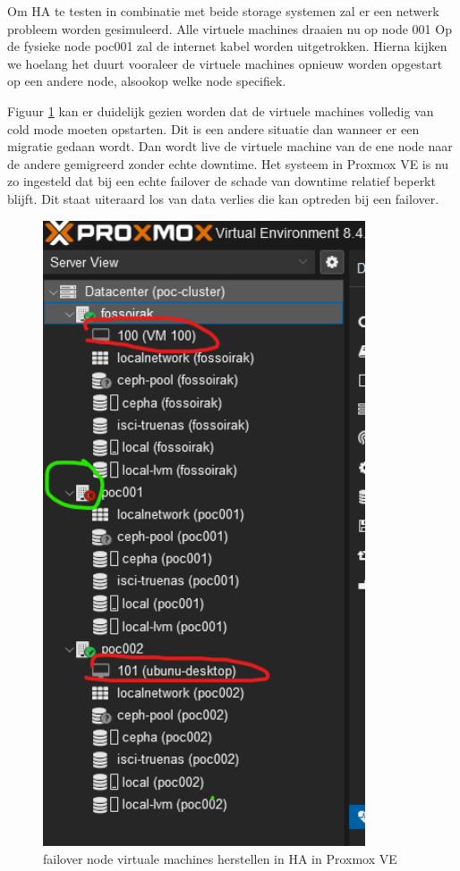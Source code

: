 Om HA te testen in combinatie met beide storage systemen zal er een netwerk probleem worden gesimuleerd.
Alle virtuele machines draaien nu op node 001
Op de fysieke node poc001 zal de internet kabel worden uitgetrokken. Hierna kijken we hoelang het duurt vooraleer de virtuele machines opnieuw worden opgestart op een andere node, alsookop welke node specifiek.

Figuur \ref{fig:failover-vm} kan er duidelijk gezien worden dat de virtuele machines volledig van cold mode moeten opstarten. Dit is een andere situatie dan wanneer er een migratie gedaan wordt.
Dan wordt live de virtuele machine van de ene node naar de andere gemigreerd zonder echte downtime.
Het systeem in Proxmox VE is nu zo ingesteld dat bij een echte failover de schade van downtime relatief beperkt blijft. Dit staat uiteraard los van data verlies die kan optreden bij een failover.
\begin{figure}[H]
  \centering
  \includegraphics[width=0.85\textwidth]{../poc/failover-prox.png}
  \caption{failover node virtuale machines herstellen in HA in Proxmox VE}
  \label{fig:failover-vm}
\end{figure}

